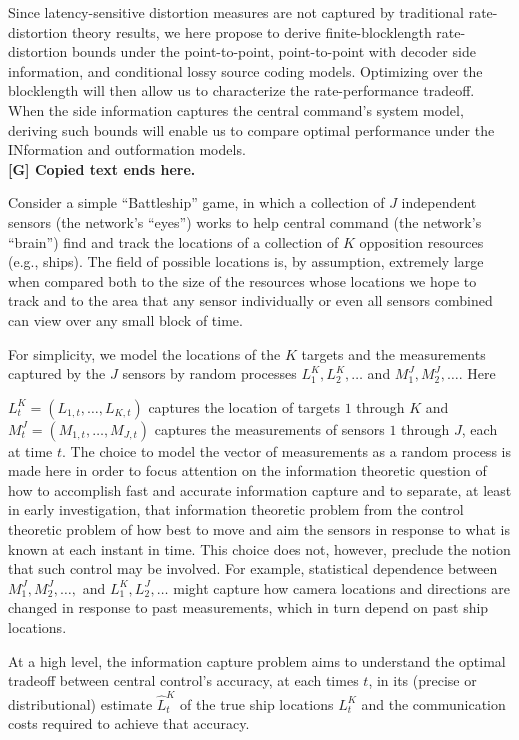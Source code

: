 \documentclass[12pt,letterpaper]{article}
\begin{document}
Since latency-sensitive distortion measures are not captured by traditional rate-distortion theory results, we here propose to derive finite-blocklength rate-distortion bounds under the point-to-point, point-to-point with decoder side information, and conditional lossy source coding models. Optimizing over the blocklength will then allow us to characterize the rate-performance tradeoff. When the side information captures the central command’s system model, deriving such bounds will enable us to compare optimal performance under the INformation and outformation models.\\
\textbf{[G] Copied text ends here.}


Consider a simple ``Battleship'' game, in which a collection of $J$ independent sensors (the network's ``eyes'') works to help central command (the network's ``brain'') find and track the locations of a collection of $K$ opposition resources (e.g., ships). The field of possible locations is, by assumption, extremely large when compared both to the size of the resources whose locations we hope to track and to the area that any sensor individually or even all sensors combined can view over any small block of time.

For simplicity, we model the locations of the $K$ targets and the measurements captured by the $J$ sensors by random processes $L^K_1,L^K_2,\ldots$ and $M^J_1,M^J_2,\ldots$. Here 

$L^K_t=(L_{1,t},\ldots,L_{K,t})$ captures the location of targets $1$ through $K$ and 
$M^J_t=(M_{1,t},\ldots,M_{J,t})$ captures the measurements of sensors $1$ through $J$, each at time $t$. The choice to model the vector of measurements as a random process is made here in order to focus attention on the information theoretic question of how to accomplish fast and accurate information capture and to separate, at least in early investigation, that information theoretic problem from the control theoretic problem of how best to move and aim the sensors in response to what is known at each instant in time. This choice does not, however, preclude the notion that such control may be involved. For example, statistical dependence between $M^J_1, M^J_2,\ldots,$ and $L^K_1, L^J_2,\ldots$ might capture how camera locations and directions are changed in response to past measurements, which in turn depend on past ship locations.

At a high level, the information capture problem aims to understand the optimal tradeoff between central control's accuracy, at each times $t$, in its (precise or distributional) estimate $\hat{L}^K_t$ of the true ship locations $L^K_t$ and the communication costs required to achieve that accuracy.
\end{document}
